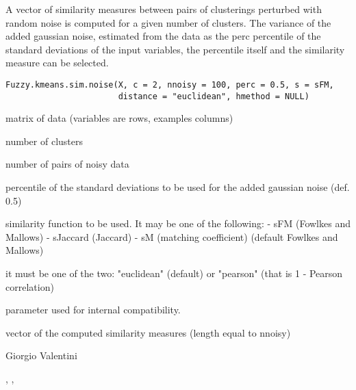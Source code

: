 \documentclass{article}
\begin{document}
\begin{Description}\relax
A vector of similarity measures between pairs of clusterings perturbed with random noise is computed for a given number of clusters. 
The variance of the added gaussian noise, estimated from the data as the perc percentile of the standard deviations of the input variables,
the percentile itself and the similarity measure can be selected.
\end{Description}
\begin{Usage}
\begin{verbatim}
Fuzzy.kmeans.sim.noise(X, c = 2, nnoisy = 100, perc = 0.5, s = sFM, 
                       distance = "euclidean", hmethod = NULL)
\end{verbatim}
\end{Usage}
\begin{Arguments}
\begin{ldescription}
\item[\code{X}] matrix of data (variables are rows, examples columns) 
\item[\code{c}] number of clusters 
\item[\code{nnoisy}] number of pairs of noisy data 
\item[\code{perc}] percentile of the standard deviations to be used for the added gaussian noise (def. 0.5) 
\item[\code{s}] similarity function to be used. It may be one of the following: 
- sFM (Fowlkes and Mallows)
- sJaccard (Jaccard)
- sM (matching coefficient)
(default Fowlkes and Mallows) 
\item[\code{distance}] it must be one of the two: "euclidean" (default) or "pearson" (that is 1 - Pearson correlation) 
\item[\code{hmethod}] parameter used for internal compatibility. 
\end{ldescription}
\end{Arguments}
\begin{Value}
vector of the computed similarity measures (length equal to nnoisy)
\end{Value}
\begin{Author}\relax
Giorgio Valentini 
\end{Author}
\begin{SeeAlso}\relax
{}, , 
\end{SeeAlso}
\end{document}

